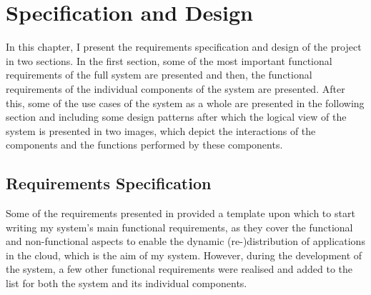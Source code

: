 \chapter{Specification and Design}\label{ch:mathtest} %
In this chapter, I present the requirements specification and design of the project in two sections. In the first section, some of the most important functional requirements of the full system are presented and then, the functional requirements of the individual components of the system are presented. After this, some of the use cases of the system as a whole are presented in the following section and including some design patterns after which the logical view of the system is presented in two images, which depict the interactions of the components and the functions performed by these components.

\section{Requirements Specification}
Some of the requirements presented in \cite{gomez2014cloud} provided a template upon which to start writing my system's main functional requirements, as they cover the functional and non-functional aspects to enable the dynamic (re-)distribution of applications in the cloud, which is the aim of my system. However, during the development of the system, a few other functional requirements were realised and added to the list for both the system and its individual components.

